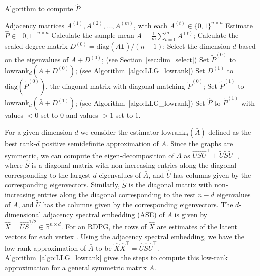\begin{algorithm}[H]
\caption{Algorithm to compute $\hat{P}$}
\label{algo:LLG_basic}
\begin{algorithmic}[1]
\REQUIRE Adjacency matrices $A^{(1)}, A^{(2)}, \dots, A^{(m)}$, with each $A^{(t)} \in \{0,1\}^{n \times n}$
\ENSURE Estimate $\hat{P}\in[0,1]^{n \times n}$
\STATE Calculate the sample mean $\bar{A} = \frac{1}{m}\sum\limits_{t = 1}^m A^{(t)}$;
\STATE Calculate the scaled degree matrix $D^{(0)} = \mathrm{diag}(\bar{A} \bm{1})/(n-1)$;
\STATE Select the dimension $d$ based on the eigenvalues of $\bar{A} + D^{(0)}$; (see Section~\ref{sec:dim_select})
\STATE Set $\tilde{P}^{(0)}$ to $\mathrm{lowrank}_d(\bar{A} + D^{(0)})$; (see Algorithm~\ref{algo:LLG_lowrank})
\STATE Set $D^{(1)}$ to $ \mathrm{diag}(\tilde{P}^{(0)})$, the diagonal matrix with diagonal matching $\tilde{P}^{(0)}$; 
\STATE Set $\tilde{P}^{(1)}$ to $\mathrm{lowrank}_d(\bar{A} + D^{(1)})$; (see Algorithm~\ref{algo:LLG_lowrank})
\STATE Set $\hat{P}$ to $\tilde{P}^{(1)}$ with values $<0$ set to $0$ and values $>1$ set to $1$.
\end{algorithmic}
\end{algorithm}


For a given dimension $d$ we consider the estimator $\mathrm{lowrank}_d(\bar{A})$ defined as the best rank-$d$ positive semidefinite approximation of $\bar{A}$.
Since the graphs are symmetric, we can compute the eigen-decomposition of $\bar{A}$ as $\hat{U} \hat{S} \hat{U}^{\top} + \tilde{U}\tilde{S}\tilde{U}^{\top}$, where $\hat{S}$ is a diagonal matrix with non-increasing entries along the diagonal corresponding to the largest $d$ eigenvalues of $\bar{A}$, and $\hat{U}$ has columns given by the corresponding eigenvectors. Similarly, $\tilde{S}$ is the diagonal matrix with non-increasing entries along the diagonal corresponding to the rest $n - d$ eigenvalues of $\bar{A}$, and $\tilde{U}$ has the columns given by the corresponding eigenvectors.
The $d$-dimensional adjacency spectral embedding (ASE) of $\bar{A}$ is given by $\hat{X}=\hat{U} \hat{S}^{1/2}\in \mathbb{R}^{n \times d}$.
For an RDPG, the rows of $\hat{X}$ are estimates of the latent vectors for each vertex \citep{sussman2014consistent}.
Using the adjacency spectral embedding, we have the low-rank approximation of $\bar{A}$ to be $\hat{X} \hat{X}^{\top}=\hat{U}\hat{S}\hat{U}^{\top}$.
Algorithm~\ref{algo:LLG_lowrank} gives the steps to compute this low-rank approximation for a general symmetric matrix $A$.

